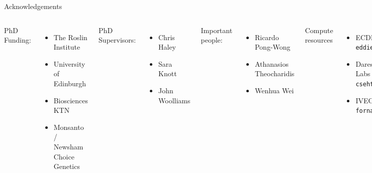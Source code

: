 \documentclass{beamer}
\begin{document}
\begin{frame}{Acknowledgements}


\begin{columns}[c]


{\tiny
PhD Funding:
\begin{itemize}
\item The Roslin Institute
\item University of Edinburgh
\item Biosciences KTN
\item Monsanto / Newsham Choice Genetics
\end{itemize}
PhD Supervisors:
\begin{itemize}
\item Chris Haley
\item Sara Knott
\item John Woolliams
\end{itemize}
Important people:
\begin{itemize}
\item Ricardo Pong-Wong
\item Athanasios Theocharidis
\item Wenhua Wei
\end{itemize}
Compute resources
\begin{itemize}
\item ECDF - {\tt eddie}
\item Daresbury Labs - {\tt cseht}
\item IVEC - {\tt fornax}
\end{itemize}
}


{\tiny
Complex Trait Genomics Group

\begin{itemize}
\item Peter Visscher
\item Naomi Wray
\item Joseph Powell
\item Jian Yang
\item Allan Mcrae
\item Anita Goldinger
\item Hong Lee
\item Anna Vinkhuyzen
\item Guo-Bo Chen
\item Beben Benyamin
\item Zong Zhang
\item Enda Byrne
\item Marie-Jo Brion
\item Sven Stringer
\end{itemize}
}

\end{columns}
\end{frame}
\end{document}
